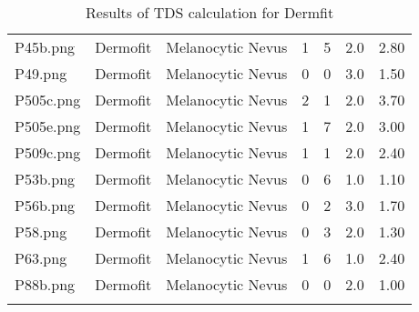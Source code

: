 \begin{longtable}{ | l | l | l | l | l | l | l |}
P45b.png & Dermofit & Melanocytic Nevus & 1 & 5 & 2.0 & 2.80 \\ 
P49.png & Dermofit & Melanocytic Nevus & 0 & 0 & 3.0 & 1.50 \\ 
P505c.png & Dermofit & Melanocytic Nevus & 2 & 1 & 2.0 & 3.70 \\ 
P505e.png & Dermofit & Melanocytic Nevus & 1 & 7 & 2.0 & 3.00 \\ 
P509c.png & Dermofit & Melanocytic Nevus & 1 & 1 & 2.0 & 2.40 \\ 
P53b.png & Dermofit & Melanocytic Nevus & 0 & 6 & 1.0 & 1.10 \\ 
P56b.png & Dermofit & Melanocytic Nevus & 0 & 2 & 3.0 & 1.70 \\ 
P58.png & Dermofit & Melanocytic Nevus & 0 & 3 & 2.0 & 1.30 \\ 
P63.png & Dermofit & Melanocytic Nevus & 1 & 6 & 1.0 & 2.40 \\ 
P88b.png & Dermofit & Melanocytic Nevus & 0 & 0 & 2.0 & 1.00 \\ 
\hline
\caption{Results of TDS calculation for Dermfit}
\label{fig:tds_results_dermfit}
\end{longtable}
